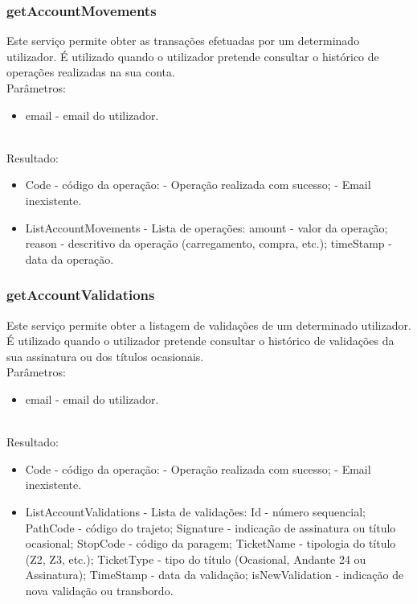 \subsubsection{getAccountMovements}

Este serviço permite obter as transações efetuadas por um determinado utilizador. É utilizado quando o utilizador pretende consultar o histórico de operações realizadas na sua conta.
\newline
~\\Parâmetros:
\begin{itemize}
\item email - email do utilizador.
\end{itemize}

~\\Resultado:
\begin{itemize}
\item Code - código da operação:
 - Operação realizada com sucesso;
 - Email inexistente.
\item ListAccountMovements - Lista de operações:
\subitem amount - valor da operação;
\subitem reason - descritivo da operação (carregamento, compra, etc.);
\subitem timeStamp - data da operação.
\end{itemize}


\subsubsection{getAccountValidations}

Este serviço permite obter a listagem de validações de um determinado utilizador. É utilizado quando o utilizador pretende consultar o histórico de validações da sua assinatura ou dos títulos ocasionais.
\newline
~\\Parâmetros:
\begin{itemize}
\item email - email do utilizador.
\end{itemize}

~\\Resultado:
\begin{itemize}
\item Code - código da operação:
 - Operação realizada com sucesso;
 - Email inexistente.
\item ListAccountValidations - Lista de validações:
\subitem Id - número sequencial;
\subitem PathCode - código do trajeto;
\subitem Signature - indicação de assinatura ou título ocasional;
\subitem StopCode - código da paragem;
\subitem TicketName - tipologia do título (Z2, Z3, etc.);
\subitem TicketType - tipo do título (Ocasional, Andante 24 ou Assinatura);
\subitem TimeStamp - data da validação;
\subitem isNewValidation - indicação de nova validação ou transbordo.
\end{itemize}

